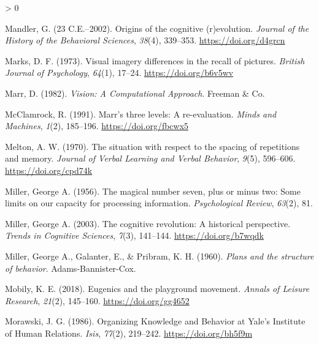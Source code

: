 \documentclass[
  oneside,
  12pt]{crumpbook}
\newlength{\cslhangindent}
\newenvironment{CSLReferences}[2] %
 {%
  \setlength{\parindent}{0pt}
  \ifodd #1 \everypar{\setlength{\hangindent}{\cslhangindent}}\ignorespaces\fi
  \ifnum #2 > 0
  \setlength{\parskip}{#2\baselineskip}
  \fi
 }%
 {}
\begin{document}
\begin{CSLReferences}{1}{0}
\leavevmode\hypertarget{ref-mandlerOriginsCognitiveEvolution23}{}%
Mandler, G. (23 C.E.--2002). Origins of the cognitive (r)evolution. \emph{Journal of the History of the Behavioral Sciences}, \emph{38}(4), 339--353. \url{https://doi.org/d4grcn}

\leavevmode\hypertarget{ref-marksVisualImageryDifferences1973}{}%
Marks, D. F. (1973). Visual imagery differences in the recall of pictures. \emph{British Journal of Psychology}, \emph{64}(1), 17--24. \url{https://doi.org/b6v5wv}

\leavevmode\hypertarget{ref-marrVisionComputationalApproach1982}{}%
Marr, D. (1982). \emph{Vision: {A Computational Approach}}. {Freeman \& Co}.

\leavevmode\hypertarget{ref-mcclamrockMarrThreeLevels1991}{}%
McClamrock, R. (1991). Marr's three levels: {A} re-evaluation. \emph{Minds and Machines}, \emph{1}(2), 185--196. \url{https://doi.org/fbcwx5}

\leavevmode\hypertarget{ref-meltonSituationRespectSpacing1970}{}%
Melton, A. W. (1970). The situation with respect to the spacing of repetitions and memory. \emph{Journal of Verbal Learning and Verbal Behavior}, \emph{9}(5), 596--606. \url{https://doi.org/cpd74k}

\leavevmode\hypertarget{ref-millerMagicalNumberSeven1956}{}%
Miller, George A. (1956). The magical number seven, plus or minus two: {Some} limits on our capacity for processing information. \emph{Psychological Review}, \emph{63}(2), 81.

\leavevmode\hypertarget{ref-millerCognitiveRevolutionHistorical2003}{}%
Miller, George A. (2003). The cognitive revolution: A historical perspective. \emph{Trends in Cognitive Sciences}, \emph{7}(3), 141--144. \url{https://doi.org/b7wqdk}

\leavevmode\hypertarget{ref-millerPlansStructureBehavior1960}{}%
Miller, George A., Galanter, E., \& Pribram, K. H. (1960). \emph{Plans and the structure of behavior}. {Adams-Bannister-Cox}.

\leavevmode\hypertarget{ref-mobilyEugenicsPlaygroundMovement2018}{}%
Mobily, K. E. (2018). Eugenics and the playground movement. \emph{Annals of Leisure Research}, \emph{21}(2), 145--160. \url{https://doi.org/gg4652}

\leavevmode\hypertarget{ref-morawskiOrganizingKnowledgeBehavior1986}{}%
Morawski, J. G. (1986). Organizing {Knowledge} and {Behavior} at {Yale}'s {Institute} of {Human Relations}. \emph{Isis}, \emph{77}(2), 219--242. \url{https://doi.org/bh5f9m}


\end{CSLReferences}
\end{document}

